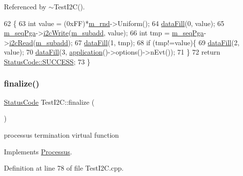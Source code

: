 Referenced by $\sim$\+Test\+I2\+C().


\begin{DoxyCode}
62                               \{
63   \textcolor{keywordtype}{int} value = (0xFF)*\hyperlink{classTestI2C_a081620c62b9da7d6bdf335a3dd992e65}{m\_rnd}->Uniform();
64   \hyperlink{classProcessus_a0d093b48f3218a088ba030e24372f18c}{dataFill}(0, value);
65   \hyperlink{classTestI2C_a0dde635489298c8d914de5f925de0b62}{m\_seqPga}->\hyperlink{classSeqPGA_a429076ca3a4ece94182bd95c623bb9d0}{i2cWrite}(\hyperlink{classTestI2C_aad3dc346b1a081e514e1d9681f89738f}{m\_subadd}, value);
66   \textcolor{keywordtype}{int} tmp = \hyperlink{classTestI2C_a0dde635489298c8d914de5f925de0b62}{m\_seqPga}->\hyperlink{classSeqPGA_a7cd344df2be99f3a02b487f80e87b27e}{i2cRead}(\hyperlink{classTestI2C_aad3dc346b1a081e514e1d9681f89738f}{m\_subadd});
67   \hyperlink{classProcessus_a0d093b48f3218a088ba030e24372f18c}{dataFill}(1, tmp);
68   \textcolor{keywordflow}{if} (tmp!=value)\{
69     \hyperlink{classProcessus_a0d093b48f3218a088ba030e24372f18c}{dataFill}(2, value);
70     \hyperlink{classProcessus_a0d093b48f3218a088ba030e24372f18c}{dataFill}(3, \hyperlink{Tools_8h_a27885a3c35afe79029fb830f32f66458}{application}()->options()->nEvt());
71   \}
72   \textcolor{keywordflow}{return} \hyperlink{classStatusCode_a6f565cbeadc76d14c72f047e5e85eb4badd0da38d3ba0d922efd1f4619bc37ad8}{StatusCode::SUCCESS};
73 \}
\end{DoxyCode}
\mbox{\label{classTestI2C_af7f36cd1607eb089a6de1bee57c388e7}} 
\subsubsection{\texorpdfstring{finalize()}{finalize()}}
{\footnotesize\ttfamily \hyperlink{classStatusCode}{Status\+Code} Test\+I2\+C\+::finalize (\begin{DoxyParamCaption}{ }\end{DoxyParamCaption})\hspace{0.3cm}{\ttfamily [virtual]}}

processus termination virtual function 

Implements \hyperlink{classProcessus_aba93d691f031bdb18ae4b8afb1b2e856}{Processus}.



Definition at line 78 of file Test\+I2\+C.\+cpp.



